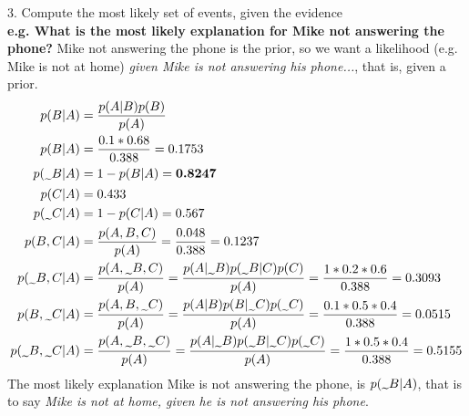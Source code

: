 \documentclass{article}
\newcommand{\midtilde}{\raisebox{-0.25\baselineskip}{\textasciitilde}}
\begin{document}
3. Compute the most likely set of events, given the evidence \\
\textbf{e.g. What is the most likely explanation for Mike not answering the phone?} Mike not answering the phone is the prior, so we want a likelihood (e.g. Mike is not at home) \textit{given Mike is not answering his phone...}, that is, given a prior.\\
\begin{align*}
p(B|A) & = \frac{p(A|B)p(B)}{p(A)} \\
p(B|A) & = \frac{0.1*0.68}{0.388} = 0.1753\\
p(\midtilde B|A) & = 1 - p(B|A) = \textbf{0.8247} \\
p(C|A) & = 0.433 \\
p(\midtilde C|A) & = 1 - p(C|A) = 0.567 \\
p(B,C|A) & = \frac{p(A,B,C)}{p(A)} = \frac{0.048}{0.388} = 0.1237 \\
p(\midtilde B, C|A) & = \frac{p(A,\midtilde B,C)}{p(A)}  = \frac{p(A|\midtilde B)p(\midtilde B|C) p(C)}{p(A)} = \frac{1*0.2*0.6}{0.388} = 0.3093\\
p(B, \midtilde C|A) & = \frac{p(A,B,\midtilde C)}{p(A)}  = \frac{p(A|B)p(B|\midtilde C) p(\midtilde C)}{p(A)} = \frac{0.1*0.5*0.4}{0.388} = 0.0515 \\
p(\midtilde B, \midtilde C | A) & = \frac{p(A,\midtilde B,\midtilde C)}{p(A)}  = \frac{p(A|\midtilde B)p(\midtilde B|\midtilde C) p(\midtilde C)}{p(A)} = \frac{1*0.5*0.4}{0.388} = 0.5155 \\
\end{align*}
The most likely explanation Mike is not answering the phone, is $p(\midtilde B|A)$, that is to say \textit{Mike is not at home, given he is not answering his phone}.
\end{document}
